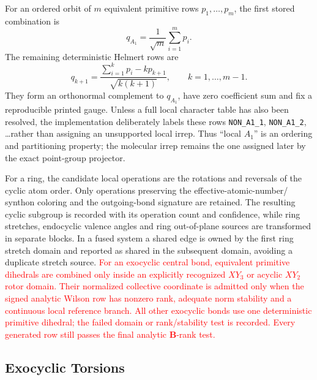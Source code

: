 \documentclass[journal=jctcce,manuscript=article,layout=traditional]{achemso}
\newcommand{\Bmat}{\mathbf{B}}
\theoremstyle{definition}
\begin{document}
For an ordered orbit of \(m\) equivalent primitive rows
\(p_1,\ldots,p_m\), the first stored combination is
\begin{equation}
  q_{A_1}=\frac{1}{\sqrt{m}}\sum_{i=1}^{m}p_i .
\end{equation}
The remaining deterministic Helmert rows are
\begin{equation}
  q_{k+1}=\frac{\sum_{i=1}^{k}p_i-kp_{k+1}}{\sqrt{k(k+1)}},
  \qquad k=1,\ldots,m-1.
  \label{eq:local-helmert-salc}
\end{equation}
They form an orthonormal complement to \(q_{A_1}\), have zero coefficient sum
and fix a reproducible printed gauge.  Unless a full local character table has
also been resolved, the implementation deliberately labels these rows
\texttt{NON\_A1\_1}, \texttt{NON\_A1\_2}, \ldots rather than assigning an
unsupported local irrep.  Thus ``local \(A_1\)'' is an ordering and partitioning
property; the molecular irrep remains the one assigned later by the exact
point-group projector.

For a ring, the candidate local operations are the rotations and reversals of
the cyclic atom order.  Only operations preserving the effective-atomic-number/
synthon coloring and the outgoing-bond signature are retained.  The resulting
cyclic subgroup is recorded with its operation count and confidence, while
ring stretches, endocyclic valence angles and ring out-of-plane sources are transformed in
separate blocks.  In a fused system a shared edge is owned by the first ring
stretch domain and reported as shared in the subsequent domain, avoiding a
duplicate stretch source.  \textcolor{red}{For an exocyclic central bond,
equivalent primitive dihedrals are combined only inside an explicitly
recognized \(XY_3\) or acyclic \(XY_2\) rotor domain.  Their normalized
collective coordinate is admitted only when the signed analytic Wilson row has
nonzero rank, adequate norm stability and a continuous local reference branch.
All other exocyclic bonds use one deterministic primitive dihedral; the failed
domain or rank/stability test is recorded.  Every generated row still passes
the final analytic \(\Bmat\)-rank test.}

\subsection{Exocyclic Torsions}
\end{document}
